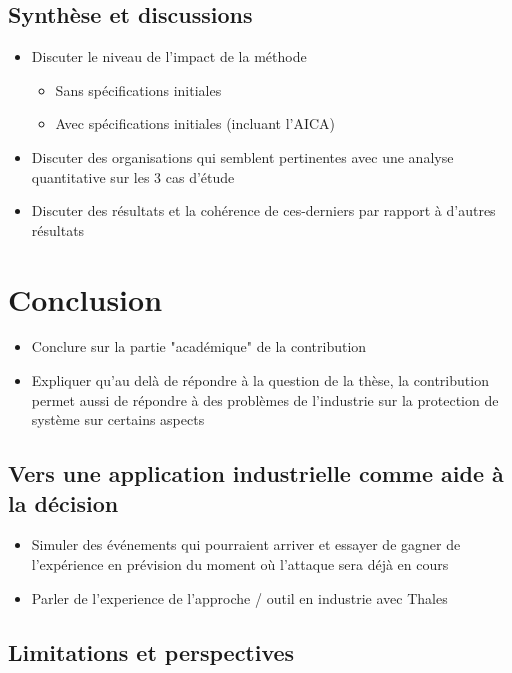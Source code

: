 \documentclass{article}
\begin{document}
\subsection{Synthèse et discussions}
\begin{itemize}

    \item Discuter le niveau de l'impact de la méthode
          \begin{itemize}
              \item Sans spécifications initiales
              \item Avec spécifications initiales (incluant l'AICA)
          \end{itemize}
    \item Discuter des organisations qui semblent pertinentes avec une analyse quantitative sur les 3 cas d'étude
    \item Discuter des résultats et la cohérence de ces-derniers par rapport à d'autres résultats
\end{itemize}



\section{Conclusion}
\begin{itemize}

    \item Conclure sur la partie "académique" de la contribution
    \item Expliquer qu'au delà de répondre à la question de la thèse, la contribution permet aussi de répondre à des problèmes de l'industrie sur la protection de système sur certains aspects
\end{itemize}

\subsection{Vers une application industrielle comme aide à la décision}
\begin{itemize}

    \item Simuler des événements qui pourraient arriver et essayer de gagner de l'expérience en prévision du moment où l’attaque sera déjà en cours
    \item Parler de l'experience de l'approche / outil en industrie avec Thales
\end{itemize}

\subsection{Limitations et perspectives}
\end{document}
